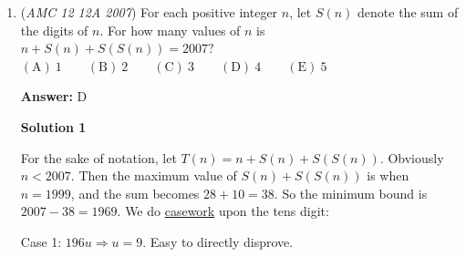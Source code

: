 \begin{enumerate}
 \textbf{Answer: }A



\textbf{Solution}

By \href{https://artofproblemsolving.com/wiki/index.php?title=Vieta\%27s\_Formulas}{Vieta's Formulas}, the sum of the roots of a \href{https://artofproblemsolving.com/wiki/index.php?title=Quadratic\_equation}{quadratic equation} is $\frac {-b}a$,  the product of the zeros is $\frac ca$, and the sum of the coefficients is $a + b + c$. Setting equal the first two tells us that $\frac {-b}{a} = \frac ca \Rightarrow b = -c$. Thus, $a + b + c = a + b - b = a$, so the common value is also equal to the coefficient of $x^2 \Longrightarrow \fbox{\textrm{A}}$. 

 To disprove the others, note that:

 
            \begin{itemize}
        \item $\mathrm{B}$: then $b = \frac {-b}a$, which is not necessarily true.
        \item $\mathrm{C}$: the y-intercept is $c$, so $c = \frac ca$, not necessarily true.
        \item $\mathrm{D}$: an x-intercept of the graph is a root of the polynomial, but this excludes the other root.
        \item $\mathrm{E}$: the mean of the x-intercepts will be the sum of the roots of the quadratic divided by 2.
            \end{itemize}
            


	\item (\textit{AMC 12 12A 2007}) For each positive integer $n$, let $S(n)$ denote the sum of the digits of $n.$ For how many values of $n$ is $n + S(n) + S(S(n)) = 2007?$
$\mathrm{(A)}\ 1 \qquad \mathrm{(B)}\ 2 \qquad \mathrm{(C)}\ 3 \qquad \mathrm{(D)}\ 4 \qquad \mathrm{(E)}\ 5$

 \textbf{Answer: }D



\textbf{Solution 1}

For the sake of notation, let $T(n) = n + S(n) + S(S(n))$. Obviously $n<2007$. Then the maximum value of $S(n) + S(S(n))$ is when $n = 1999$, and the sum becomes $28 + 10 = 38$. So the minimum bound is $2007-38=1969$. We do \href{https://artofproblemsolving.com/wiki/index.php?title=Casework}{casework} upon the tens digit:

 Case 1: $196u \Longrightarrow u = 9$. Easy to directly disprove.


\end{enumerate}
